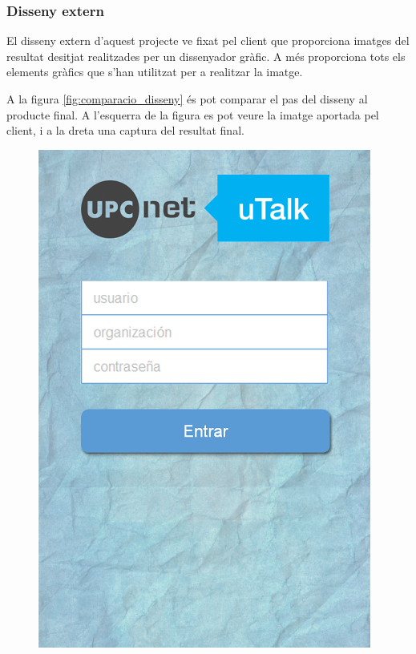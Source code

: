 
\subsubsection{Disseny extern}

El disseny extern d'aquest projecte ve fixat pel client que proporciona imatges del resultat desitjat realitzades per un dissenyador gràfic. A més proporciona tots els elements gràfics que s'han utilitzat per a realitzar la imatge.

A la figura \ref{fig:comparacio_disseny} és pot comparar el pas del disseny al producte final. A l'esquerra de la figura es pot veure la imatge aportada pel client, i a la dreta una captura del resultat final.


\begin{figure}[ht]
    \begin{minipage}[t]{.48\textwidth}
        \centering
        \includegraphics[scale=0.518]{Memoria/Arquitectura/Projecte/Presentacio/disseny_login.png}
    \end{minipage}%
    \hfill
    \begin{minipage}[t]{.48\textwidth}

\end{minipage}
\end{figure}
